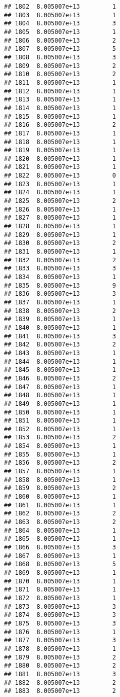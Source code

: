 \documentclass[
]{article}
\begin{document}
\begin{verbatim}
## 1802  8.005007e+13         1
## 1803  8.005007e+13         1
## 1804  8.005007e+13         3
## 1805  8.005007e+13         1
## 1806  8.005007e+13         2
## 1807  8.005007e+13         5
## 1808  8.005007e+13         3
## 1809  8.005007e+13         2
## 1810  8.005007e+13         2
## 1811  8.005007e+13         1
## 1812  8.005007e+13         1
## 1813  8.005007e+13         1
## 1814  8.005007e+13         1
## 1815  8.005007e+13         1
## 1816  8.005007e+13         2
## 1817  8.005007e+13         1
## 1818  8.005007e+13         1
## 1819  8.005007e+13         1
## 1820  8.005007e+13         1
## 1821  8.005007e+13         1
## 1822  8.005007e+13         0
## 1823  8.005007e+13         1
## 1824  8.005007e+13         1
## 1825  8.005007e+13         2
## 1826  8.005007e+13         1
## 1827  8.005007e+13         1
## 1828  8.005007e+13         1
## 1829  8.005007e+13         1
## 1830  8.005007e+13         2
## 1831  8.005007e+13         1
## 1832  8.005007e+13         2
## 1833  8.005007e+13         3
## 1834  8.005007e+13         1
## 1835  8.005007e+13         9
## 1836  8.005007e+13         3
## 1837  8.005007e+13         1
## 1838  8.005007e+13         2
## 1839  8.005007e+13         1
## 1840  8.005007e+13         1
## 1841  8.005007e+13         3
## 1842  8.005007e+13         2
## 1843  8.005007e+13         1
## 1844  8.005007e+13         1
## 1845  8.005007e+13         1
## 1846  8.005007e+13         2
## 1847  8.005007e+13         1
## 1848  8.005007e+13         1
## 1849  8.005007e+13         1
## 1850  8.005007e+13         1
## 1851  8.005007e+13         1
## 1852  8.005007e+13         1
## 1853  8.005007e+13         2
## 1854  8.005007e+13         1
## 1855  8.005007e+13         1
## 1856  8.005007e+13         2
## 1857  8.005007e+13         1
## 1858  8.005007e+13         1
## 1859  8.005007e+13         2
## 1860  8.005007e+13         1
## 1861  8.005007e+13         1
## 1862  8.005007e+13         2
## 1863  8.005007e+13         2
## 1864  8.005007e+13         1
## 1865  8.005007e+13         1
## 1866  8.005007e+13         3
## 1867  8.005007e+13         1
## 1868  8.005007e+13         5
## 1869  8.005007e+13         1
## 1870  8.005007e+13         1
## 1871  8.005007e+13         1
## 1872  8.005007e+13         1
## 1873  8.005007e+13         3
## 1874  8.005007e+13         3
## 1875  8.005007e+13         3
## 1876  8.005007e+13         1
## 1877  8.005007e+13         3
## 1878  8.005007e+13         1
## 1879  8.005007e+13         2
## 1880  8.005007e+13         2
## 1881  8.005007e+13         3
## 1882  8.005007e+13         2
## 1883  8.005007e+13         2

\end{verbatim}
\end{document}
